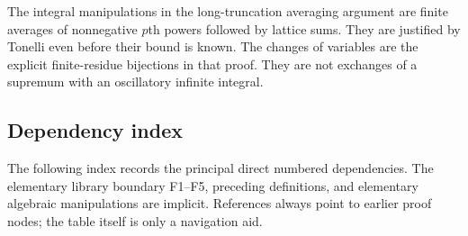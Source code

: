 \documentclass[11pt,oneside]{article}
\theoremstyle{definition}\newtheorem{definition}[theorem]{Definition}
\theoremstyle{remark}\newtheorem{remark}[theorem]{Remark}
\begin{document}
The integral manipulations in the long-truncation averaging argument are
finite averages of nonnegative $p$th powers followed by lattice sums.
They are justified by Tonelli even before their bound is known. The changes
of variables are the explicit finite-residue bijections in that proof.
They are not exchanges of a supremum with an oscillatory infinite integral.

\subsection{Dependency index}
The following index records the principal direct numbered dependencies.
The elementary library boundary F1--F5, preceding definitions, and elementary
algebraic manipulations are implicit. References always point to earlier
proof nodes; the table itself is only a navigation aid.
\end{document}
